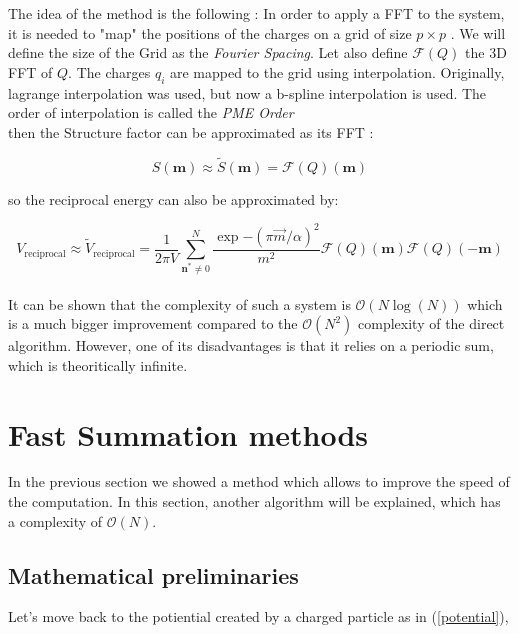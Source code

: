 \documentclass[12pt,twoside,a4paper]{report}
\begin{document}
The idea of the method is the following : In order to apply a FFT to the system, it is needed to "map" the positions of the charges on a grid of size $ p \times p $ . We will define the size of the Grid as the \textit{Fourier Spacing}. Let also define $\mathcal{F}(Q)$ the 3D FFT of $Q$. The charges $q_i$ are mapped to the grid using interpolation. 
Originally, lagrange interpolation was used, but now a b-spline interpolation is used. The order of interpolation is called the \textit{PME Order}\\

then the Structure factor can be approximated as its FFT :

\begin{equation}
   S(\textbf{m}) \approx \widetilde{S}(\textbf{m}) = \mathcal{F}(Q)(\textbf{m})
\end{equation}

so the reciprocal energy can also be approximated by:

\begin{equation}
   V_{\text{reciprocal}} \approx \widetilde{V}_{\text{reciprocal}}   =\frac{1}{2 \pi V} \sum\limits_{\textbf{n}^* \neq 0}^{N}  \frac{\exp{-(\pi \overrightarrow{m}/\alpha)^2}}{m^2}\mathcal{F}(Q)(\textbf{m})\mathcal{F}(Q)(-\textbf{m})
\end{equation} \\

It can be shown that the complexity of such a system is $\mathcal{O}(N \log(N))$ which is a much bigger improvement compared to the $\mathcal{O}(N^2)$ complexity of the direct algorithm. However, one of its disadvantages is that it relies on a periodic sum, which is theoritically infinite.



\section{Fast Summation methods}

    In the previous section we showed a method which allows to improve the speed of the computation. In this section, another algorithm will be explained, which has a complexity of $\mathcal{O}(N)$.\\
    
	\subsection{Mathematical preliminaries}
	
	Let's move back to the potiential created by a charged particle as in (\ref{potential}),
	
\end{document}

